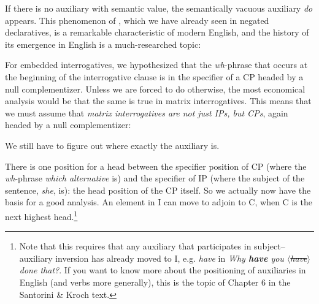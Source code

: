 \documentclass{article}
\begin{document}
If there is no auxiliary with semantic value, the semantically vacuous auxiliary \emph{do} appears.
This phenomenon of , which we have already seen in negated declaratives, is a remarkable characteristic of modern English, and the history of its emergence in English is a much-researched topic:
\begin{exe}
\end{exe}       
For embedded interrogatives, we hypothesized that the \emph{wh}-phrase that occurs at the beginning of the interrogative clause is in the specifier of a CP headed by a null complementizer.
Unless we are forced to do otherwise, the most economical analysis would be that the same is true in matrix interrogatives.
This means that we must assume that \emph{matrix interrogatives are not just IPs, but CPs}, again headed by a null complementizer:
\begin{exe}
\end{exe}
We still have to figure out where exactly the auxiliary is.  

There is one position for a head between the specifier position of CP (where the \emph{wh}-phrase \emph{which alternative} is) and the specifier of IP (where the subject of the sentence, \emph{she}, is): the head position of the CP itself.
So we actually now have the basis for a good analysis.
An element in I can move to adjoin to C, when C is the next highest head.\footnote{Note that this requires that any auxiliary that participates in subject--auxiliary inversion has already moved to I, e.g. \emph{have} in \emph{Why \textbf{have} you $\langle$\sout{have}$\rangle$ done that?}.
If you want to know more about the positioning of auxiliaries in English (and verbs more generally), this is the topic of Chapter 6 in the Santorini \& Kroch text.}
\end{document}

